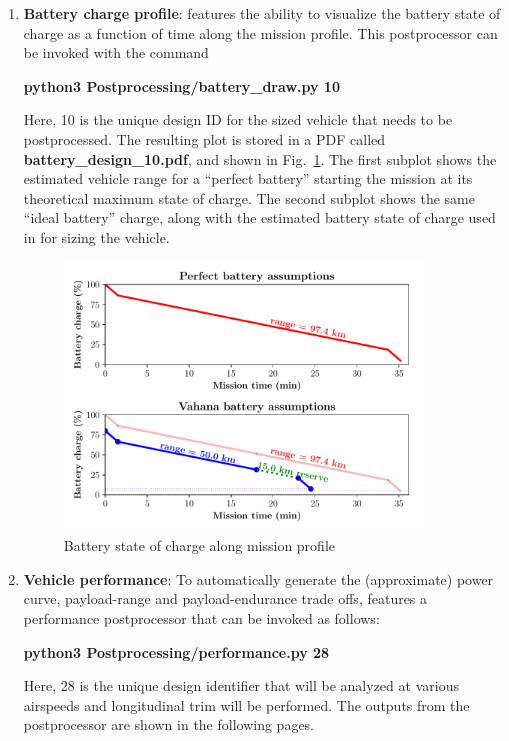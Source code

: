 \begin{enumerate}
\item \textbf{Battery charge profile}: \hydra \spc features the ability to visualize the battery state of charge as a function of time along the mission profile. This postprocessor can be invoked with the command 
\begin{center}
\textbf{python3 Postprocessing/battery\_draw.py 10}
\end{center}
Here, 10 is the unique design ID for the sized vehicle that needs to be postprocessed. The resulting plot is stored in a PDF called \textbf{battery\_design\_10.pdf}, and shown in Fig.~\ref{fig:battery_profile}. The first subplot shows the estimated vehicle range for a ``perfect battery'' starting the mission at its theoretical maximum state of charge. The second subplot shows the same ``ideal battery'' charge, along with the estimated battery state of charge used in \hydra \spc for sizing the vehicle.

\begin{figure}
     \centering
\includegraphics[width=0.9\textwidth]{images/battery_design_10.pdf}
\caption{Battery state of charge along mission profile}
\label{fig:battery_profile}
\end{figure}

\item \textbf{Vehicle performance}: To automatically generate the (approximate) power curve, payload-range and payload-endurance trade offs, \hydra \spc features a performance postprocessor that can be invoked as follows:
\begin{center}
\textbf{python3 Postprocessing/performance.py 28}
\end{center}
Here, 28 is the unique design identifier that will be analyzed at various airspeeds and longitudinal trim will be performed. The outputs from the postprocessor are shown in the following pages.


\end{enumerate}
